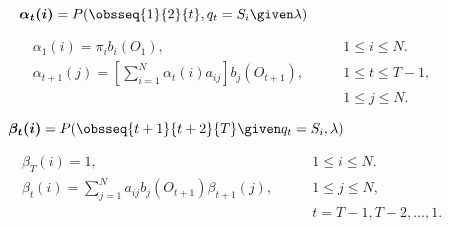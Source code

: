 \begin{equation}
\boldsymbol{\alpha_t(i)} = P(\obsseq{1}{2}{t}, q_t = S_i \given \lambda)
\hspace{9.8em}\label{eq:fw:forw}
\end{equation}

\begin{align}
\alpha_1(i) = \pi_i b_i(O_1),\qquad &1 \leq i \leq N.
\label{eq:fw:forw:init} \\
\alpha_{t+1}(j) = [\sum_{i=1}^N \alpha_t(i) a_{ij}] b_j(O_{t+1}),
\qquad &1 \leq t \leq T - 1, \nonumber \\
&1 \leq j \leq N.\label{eq:fw:forw:loop}
\end{align}

\begin{equation}
\boldsymbol{\beta_t(i)} = P(\obsseq{t+1}{t+2}{T} \given q_t = S_i, \lambda)
\hspace{8em}\label{eq:fw:back}
\end{equation}

\begin{align}
\beta_T(i) = 1,\qquad &1 \leq i \leq N.
\label{eq:fw:back:init} \\
\beta_{t}(i) = \sum_{j=1}^N a_{ij} b_j(O_{t+1}) \beta_{t+1}(j),\qquad
&1 \leq j \leq N, \nonumber \\
&t = T-1, T-2, \dots, 1.
\label{eq:fw:back:loop}
\end{align}

